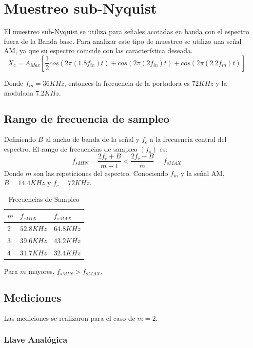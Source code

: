 \documentclass[../../ASSD_TP1_G7.tex]{subfiles}
\begin{document}
\chapter*{Muestreo sub-Nyquist}
El muestreo sub-Nyquist se utiliza para se\~nales acotadas en banda con el espectro fuera de la Banda base. Para analizar este tipo de muestreo se utilizo una se\~nal AM, ya que su espectro coincide con las característica deseada.
\begin{equation}
X_c=A_{Max}[\frac{1}{2}cos(2\pi (1.8 f_{in})t)+cos(2\pi (2 f_{in})t)+cos(2\pi (2.2 f_{in})t)]
\end{equation}\label{eq:inputSignlan}

Donde $f_{in}= 36KHz$, entonces la frecuencia de la portadora es $72KHz$ y la modulada $7.2KHz$.
\section*{Rango de frecuencia de sampleo}
Definiendo $B$ al ancho de banda de la se\~nal y $f_c$ a la frecuencia central del espectro. El rango de frecuencias de sampleo $(f_s)$ es:
\begin{equation}
f_{sMIN}=\frac{2f_c + B}{m+1} < \frac{2f_c - B}{m} = f_{sMAX}
\end{equation}
Donde $m$ son las repeticiones del espectro. Conociendo $f_{in}$ y la se\~nal AM, $B=14.4KHz$ y $f_c=72KHz$.

\begin{table}[htbp]
\begin{center}
\begin{tabular}{|l|l|l|}
\hline
$m$ & $f_{sMIN}$ & $f_{sMAX}$  \\
\hline \hline
2 & $52.8KHz$ & $64.8KHz$ \\ \hline
3 & $39.6KHz$ & $43.2KHz$ \\ \hline
4 & $31.7KHz$ & $32.4KHz$ \\ \hline
\end{tabular}
\caption{Frecuencias de Sampleo}
\label{tabla:fsamp}
\end{center}
\end{table}
Para $m$ mayores, $f_{sMIN}>f_{sMAX}$.
\section*{Mediciones}
Las mediciones se realizaron para el caso de $m=2$.
\subsection*{Llave Analógica}
\end{document}

